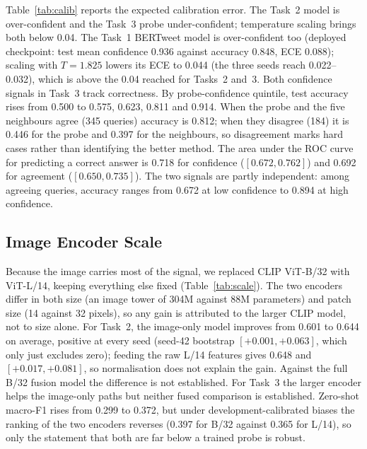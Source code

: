 \documentclass[conference]{IEEEtran}
\begin{document}
Table~\ref{tab:calib} reports the expected calibration error. The Task~2 model is over-confident and the Task~3 probe under-confident; temperature scaling brings both below 0.04. The Task~1 BERTweet model is over-confident too (deployed checkpoint: test mean confidence 0.936 against accuracy 0.848, ECE 0.088); scaling with $T=1.825$ lowers its ECE to 0.044 (the three seeds reach 0.022--0.032), which is above the 0.04 reached for Tasks~2 and~3. Both confidence signals in Task~3 track correctness. By probe-confidence quintile, test accuracy rises from 0.500 to 0.575, 0.623, 0.811 and 0.914. When the probe and the five neighbours agree (345 queries) accuracy is 0.812; when they disagree (184) it is 0.446 for the probe and 0.397 for the neighbours, so disagreement marks hard cases rather than identifying the better method. The area under the ROC curve for predicting a correct answer is 0.718 for confidence ($[0.672, 0.762]$) and 0.692 for agreement ($[0.650, 0.735]$). The two signals are partly independent: among agreeing queries, accuracy ranges from 0.672 at low confidence to 0.894 at high confidence.

\subsection{Image Encoder Scale}
\label{sec:scale}
Because the image carries most of the signal, we replaced CLIP ViT-B/32 with ViT-L/14, keeping everything else fixed (Table~\ref{tab:scale}). The two encoders differ in both size (an image tower of 304M against 88M parameters) and patch size (14 against 32 pixels), so any gain is attributed to the larger CLIP model, not to size alone. For Task~2, the image-only model improves from 0.601 to 0.644 on average, positive at every seed (seed-42 bootstrap $[+0.001, +0.063]$, which only just excludes zero); feeding the raw L/14 features gives 0.648 and $[+0.017, +0.081]$, so normalisation does not explain the gain. Against the full B/32 fusion model the difference is not established. For Task~3 the larger encoder helps the image-only paths but neither fused comparison is established. Zero-shot macro-F1 rises from 0.299 to 0.372, but under development-calibrated biases the ranking of the two encoders reverses (0.397 for B/32 against 0.365 for L/14), so only the statement that both are far below a trained probe is robust.
\end{document}
